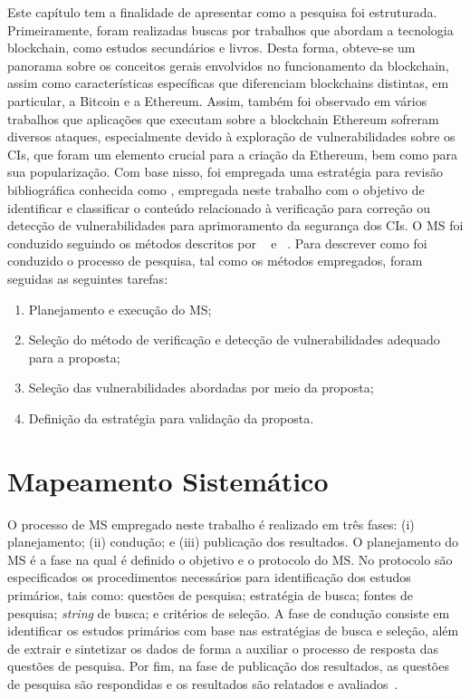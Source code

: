 Este capítulo tem a finalidade de apresentar como a pesquisa foi estruturada. Primeiramente, foram realizadas buscas por trabalhos que abordam a tecnologia blockchain, como estudos secundários e livros. Desta forma, obteve-se um panorama sobre os conceitos gerais envolvidos no funcionamento da blockchain, assim como características específicas que diferenciam blockchains distintas, em particular, a Bitcoin e a Ethereum. Assim, também foi observado em vários trabalhos que aplicações que executam sobre a blockchain Ethereum sofreram diversos ataques, especialmente devido à exploração de vulnerabilidades sobre os CIs, que foram um elemento crucial para a criação da Ethereum, bem como para sua popularização. Com base nisso, foi empregada uma estratégia para revisão bibliográfica conhecida como , empregada neste trabalho com o objetivo de identificar e classificar o conteúdo relacionado à verificação para correção ou detecção de vulnerabilidades para aprimoramento da segurança dos CIs. O MS foi conduzido seguindo os métodos descritos por ~ e ~. Para descrever como foi conduzido o processo de pesquisa, tal como os métodos empregados, foram seguidas as seguintes tarefas:

\begin{enumerate}
    \item Planejamento e execução do MS;
    \item Seleção do método de verificação e detecção de vulnerabilidades adequado para a proposta;
    \item Seleção das vulnerabilidades abordadas por meio da proposta;
    \item Definição da estratégia para validação da proposta.
\end{enumerate}


\section{Mapeamento Sistemático} \label{tex:rev:ms}

O processo de MS empregado neste trabalho é realizado em três fases: (i) planejamento; (ii) condução; e (iii) publicação dos resultados. O planejamento do MS é a fase na qual é definido o objetivo e o protocolo do MS. No protocolo são especificados os procedimentos necessários para identificação dos estudos primários, tais como: questões de pesquisa; estratégia de busca; fontes de pesquisa; \textit{string} de busca; e critérios de seleção. A fase de condução consiste em identificar os estudos primários com base nas estratégias de busca e seleção, além de extrair e sintetizar os dados de forma a auxiliar o processo de resposta das questões de pesquisa. Por fim, na fase de publicação dos resultados, as questões de pesquisa são respondidas e os resultados são relatados e avaliados~\cite{nakagawa2017revisao, kitchenham2007guidelines}.  

